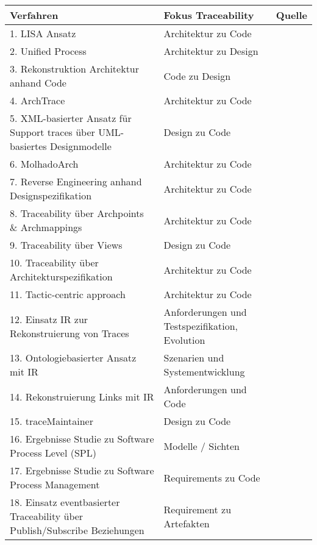 \begin{table}[htbp]
\centering
\begin{threeparttable}
\begin{tabularx}{\columnwidth}{@{}XXl@{}}
\toprule
Verfahren & Fokus Traceability & Quelle  \\ \midrule
1. LISA Ansatz & Architektur zu Code & \cite{Javed2014ACode} \\
2. Unified Process & Architektur zu Design & \cite{Javed2014ACode} \\
3. Rekonstruktion Architektur anhand Code & Code zu Design & \cite{Javed2014ACode} \\
4. ArchTrace & Architektur zu Code & \cite{Javed2014ACode} \\
5. XML-basierter Ansatz für Support traces über UML-basiertes Designmodelle & Design zu Code & \cite{Javed2014ACode} \\
6. MolhadoArch & Architektur zu Code & \cite{Javed2014ACode} \\
7. Reverse Engineering anhand Designspezifikation & Architektur zu Code & \cite{Javed2014ACode} \\
8. Traceability über Archpoints \& Archmappings & Architektur zu Code & \cite{Javed2014ACode} \\
9. Traceability über Views & Design zu Code & \cite{Javed2014ACode} \\
10. Traceability über Architekturspezifikation & Architektur zu Code & \cite{Javed2014ACode} \\
11. Tactic-centric approach & Architektur zu Code & \cite{Javed2014ACode} \\
12. Einsatz IR zur Rekonstruierung von Traces & Anforderungen und Testspezifikation, Evolution & \cite{Leuser2010TacklingSpecifications, Merten2016DoData} \\
13. Ontologiebasierter Ansatz mit IR & Szenarien und Systementwicklung & \cite{Saputri2016EnsuringApproach} \\
14. Rekonstruierung Links mit IR & Anforderungen und Code & \cite{Tsuchiya2013RecoveringProducts} \\
15. traceMaintainer & Design zu Code & \cite{Mader2009EnablingRelations} \\
16. Ergebnisse Studie zu Software Process Level (SPL) & Modelle / Sichten & \cite{Lago2009AManagement} \\
17. Ergebnisse Studie zu Software Process Management & Requirements zu Code & \cite{Lago2009AManagement} \\
18. Einsatz eventbasierter Traceability über Publish/Subscribe Beziehungen & Requirement zu Artefakten & \cite{Mder2012TowardsMaintenance} \\

\end{tabularx}
\end{threeparttable}
\end{table}
